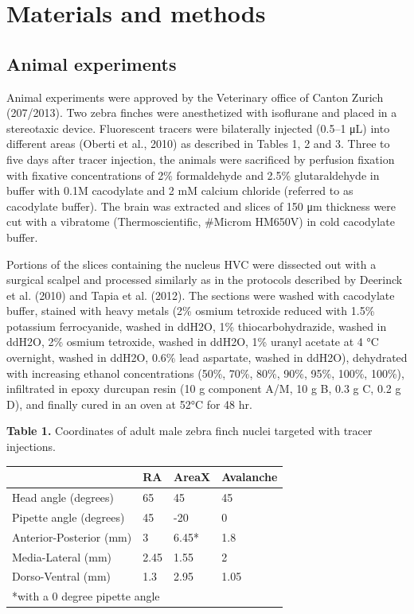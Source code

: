 \documentclass{article}
\begin{document}
\section*{Materials and methods}

\subsection*{Animal experiments}

Animal experiments were approved by the Veterinary office of Canton Zurich (207/2013). Two zebra finches were anesthetized with isoflurane and placed in a stereotaxic device. Fluorescent tracers were bilaterally injected (0.5–1 μL) into different areas (Oberti et al., 2010) as described in Tables 1, 2 and 3. Three to five days after tracer injection, the animals were sacrificed by perfusion fixation with fixative concentrations of 2\% formaldehyde and 2.5\% glutaraldehyde in buffer with 0.1M cacodylate and 2 mM calcium chloride (referred to as cacodylate buffer). The brain was extracted and slices of 150 μm thickness were cut with a vibratome (Thermoscientific, \#Microm HM650V) in cold cacodylate buffer.

Portions of the slices containing the nucleus HVC were dissected out with a surgical scalpel and processed similarly as in the protocols described by Deerinck et al. (2010) and Tapia et al. (2012). The sections were washed with cacodylate buffer, stained with heavy metals (2\% osmium tetroxide reduced with 1.5\% potassium ferrocyanide, washed in ddH2O, 1\% thiocarbohydrazide, washed in ddH2O, 2\% osmium tetroxide, washed in ddH2O, 1\% uranyl acetate at 4 °C overnight, washed in ddH2O, 0.6\% lead aspartate, washed in ddH2O), dehydrated with increasing ethanol concentrations (50\%, 70\%, 80\%, 90\%, 95\%, 100\%, 100\%), infiltrated in epoxy durcupan resin (10 g component A/M, 10 g B, 0.3 g C, 0.2 g D), and finally cured in an oven at 52°C for 48 hr.

\medskip
\noindent\textbf{Table 1.} Coordinates of adult male zebra finch nuclei targeted with tracer injections.\par\nopagebreak
\noindent\begin{tabular}{llll}
\toprule
 & \textbf{RA} & \textbf{AreaX} & \textbf{Avalanche} \\
\midrule
Head angle (degrees) & 65 & 45 & 45 \\
Pipette angle (degrees) & 45 & -20 & 0 \\
Anterior-Posterior (mm) & 3 & 6.45* & 1.8 \\
Media-Lateral (mm) & 2.45 & 1.55 & 2 \\
Dorso-Ventral (mm) & 1.3 & 2.95 & 1.05 \\
\midrule
\multicolumn{4}{l}{*with a 0 degree pipette angle} \\
\bottomrule
\end{tabular}
\end{document}
